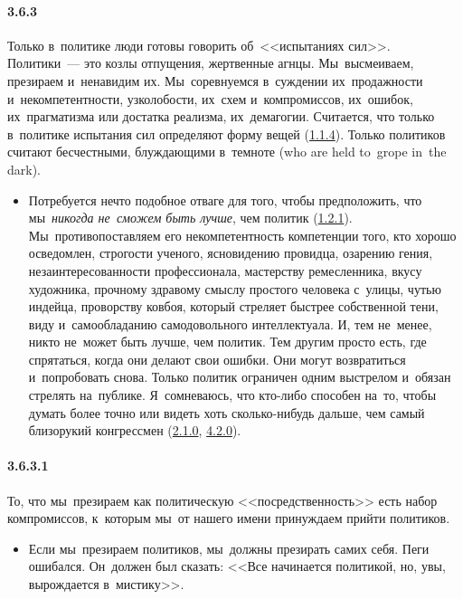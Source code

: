 \paragraph{3.6.3}\hypertarget{par:3.6.3}{} Только в~политике люди готовы говорить об~<<испытаниях сил>>. Политики~--- это козлы отпущения, жертвенные агнцы. Мы~высмеиваем, презираем и~ненавидим их. Мы~соревнуемся в~суждении их~продажности и~некомпетентности, узколобости, их~схем и~компромиссов, их~ошибок, их~прагматизма или достатка реализма, их~демагогии. Считается, что только в~политике испытания сил определяют форму вещей (\hyperlink{par:1.1.4}{1.1.4}). Только политиков считают бесчестными, блуждающими в~темноте (who are held to~grope in~the dark). 
	\begin{itemize}
	\item 
	Потребуется нечто подобное отваге для того, чтобы предположить, что мы~{\itshape никогда не~сможем быть лучше}, чем политик (\hyperlink{par:1.2.1}{1.2.1}). Мы~противопоставляем его некомпетентность компетенции того, кто хорошо осведомлен, строгости ученого, ясновидению провидца, озарению гения, незаинтересованности профессионала, мастерству ремесленника, вкусу художника, прочному здравому смыслу простого человека с~улицы, чутью индейца, проворству ковбоя, который стреляет быстрее собственной тени, виду и~самообладанию самодовольного интеллектуала. И, тем не~менее, никто не~может быть лучше, чем политик. Тем другим просто есть, где спрятаться, когда они делают свои ошибки. Они могут возвратиться и~попробовать снова. Только политик ограничен одним выстрелом и~обязан стрелять на~публике. Я~сомневаюсь, что кто-либо способен на~то, чтобы думать более точно или видеть хоть сколько-нибудь дальше, чем самый близорукий конгрессмен (\hyperlink{par:2.1.0}{2.1.0}, \hyperlink{par:4.2.0}{4.2.0}).
	\end{itemize}

\paragraph{3.6.3.1}\hypertarget{par:3.6.3.1}{} То, что мы~презираем как политическую <<посредственность>> есть набор компромиссов, к~которым мы~от нашего имени принуждаем прийти политиков.
	\begin{itemize}
	\item 
	Если мы~презираем политиков, мы~должны презирать самих себя. Пеги ошибался. Он~должен был сказать: <<Все начинается политикой, но, увы, вырождается в~мистику>>.
	\end{itemize}

